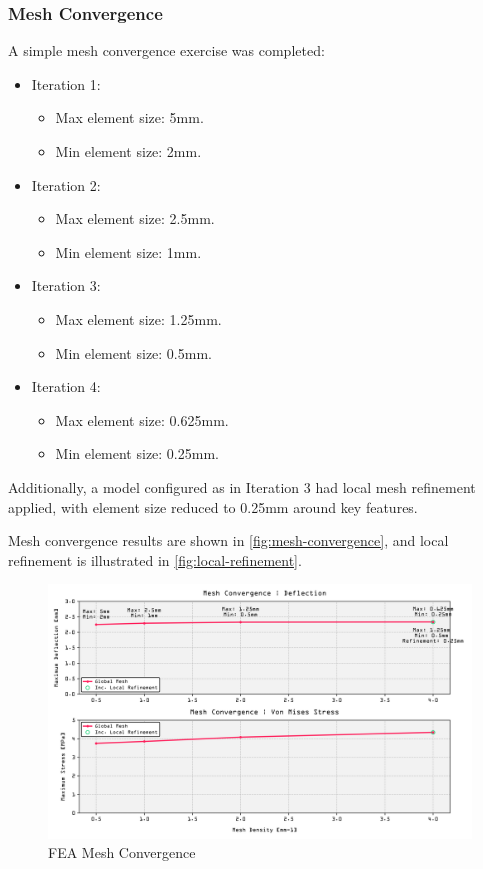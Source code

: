 \documentclass[10pt]{article}
\begin{document}
\subsubsection{Mesh Convergence}
A simple mesh convergence exercise was completed:
\begin{itemize}[leftmargin=*]
	\item Iteration 1:
	      \begin{itemize}
		      \item Max element size: 5mm.
		      \item Min element size: 2mm.
	      \end{itemize}
	\item Iteration 2:
	      \begin{itemize}
		      \item Max element size: 2.5mm.
		      \item Min element size: 1mm.
	      \end{itemize}
	\item Iteration 3:
	      \begin{itemize}
		      \item Max element size: 1.25mm.
		      \item Min element size: 0.5mm.
	      \end{itemize}
	\item Iteration 4:
	      \begin{itemize}
		      \item Max element size: 0.625mm.
		      \item Min element size: 0.25mm.
	      \end{itemize}
\end{itemize}

Additionally, a model configured as in Iteration 3 had local mesh refinement applied, with element
size reduced to 0.25mm around key features.

Mesh convergence results are shown in \autoref{fig:mesh-convergence}, and local refinement is
illustrated in \autoref{fig:local-refinement}.

\begin{figure}[H]
	\centering
	\includegraphics[width=\textwidth]{./assets/12-mesh-convergence.png}
	\caption{FEA Mesh Convergence}
	\label{fig:mesh-convergence}
\end{figure}
\end{document}
